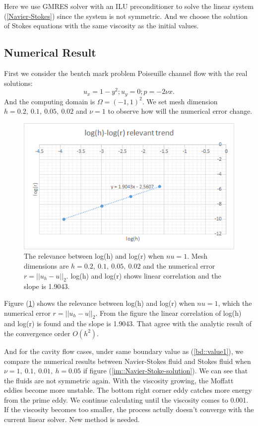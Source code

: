 \documentclass[a4paper]{article}
\begin{document}
Here we use GMRES solver with an ILU preconditioner to solve the
linear system (\ref{Navier-Stokes}) since the system is not
symmetric. And we choose the solution of Stokes equations with the
same viscosity as the initial values.

\subsection{Numerical Result}
First we consider the bentch mark problem Poiseuille channel flow with the real solutions:
\begin{equation}
u_x = 1-y^2;  u_y = 0; p=-2\nu x.
\label{pr::accurate}
\end{equation}
And the computing domain is $\Omega = (-1,1)^2$. We set mesh dimension
$h=0.2,\ 0.1,\ 0.05,\ 0.02$ and $\nu=1$ to observe how will the
numerical error change.

\begin{figure}[h]
\centering
\includegraphics[scale = 0.8]{images/convergence.png}
\caption{The relevance between log(h) and log(r) when $nu=1$.  Mesh
  dimensions are $h=0.2,\ 0.1, \ 0.05, \ 0.02$ and the numerical error
  $r=||u_h-u||_2$. log(h) and log(r) shows linear correlation and the
  slope is 1.9043.}
\label{im::log(h)-res}
\end{figure}

Figure (\ref{im::log(h)-res}) shows the relevance between log(h) and
log(r) when $nu=1$, which the numerical error $r=||u_h-u||_2$. From
the figure the linear correlation of log(h) and log(r) is found and
the slope is 1.9043. That agree with the analytic result of the
convergence order $O(h^2)$.

And for the cavity flow cases, under same boundary value as
(\ref{bd::value1}), we compare the numerical results between
Navier-Stokes fluid and Stokes fluid when
$\nu=1,\ 0.1,\ 0.01,\ h=0.05$ if figure
(\ref{im::Navier-Stoke-solution}).
We can see that the fluids are not
symmetric again. With the viscosity growing, the Moffatt eddies become
more unstable. The bottom right corner eddy catches more energy from
the prime eddy. We continue calculating until the viscosity comes to
0.001. If the viscosity becomes too smaller, the process actully doesn't
converge with the current linear solver. New method is needed.
\end{document}
